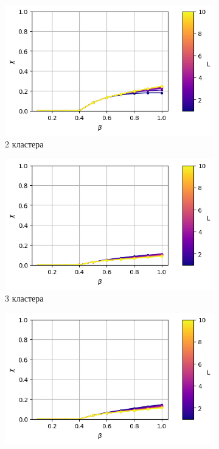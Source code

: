 \documentclass[14pt]{extarticle}
\begin{document}
\begin{figure}[ht]
	\centering
    \begin{subfigure}[t]{0.3\textwidth}
        \includegraphics*[width=\textwidth]{../images/magnetic_susceptibility/clusterized_W41_H41_N2.png}
        \caption*{2 кластера}
    \end{subfigure}
    \begin{subfigure}[t]{0.3\textwidth}
        \includegraphics*[width=\textwidth]{../images/magnetic_susceptibility/clusterized_W41_H41_N3.png}
        \caption*{3 кластера}
    \end{subfigure}
    \begin{subfigure}[t]{0.3\textwidth}
        \includegraphics*[width=\textwidth]{../images/magnetic_susceptibility/clusterized_W41_H41_N4.png}

\end{subfigure}
\end{figure}
\end{document}
